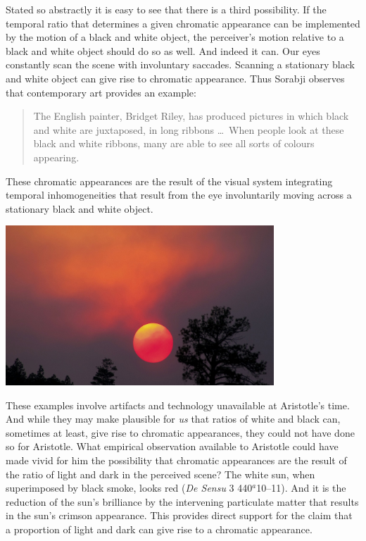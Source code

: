 Stated so abstractly it is easy to see that there is a third possibility. If the temporal ratio that determines a given chromatic appearance can be implemented by the motion of a black and white object, the perceiver's motion relative to a black and white object should do so as well. And indeed it can. Our eyes constantly scan the scene with involuntary saccades. Scanning a stationary black and white object can give rise to chromatic appearance. Thus Sorabji observes that contemporary art provides an example:
\begin{quote}
    The English painter, Bridget Riley, has produced pictures in which black and white are juxtaposed, in long ribbons \ldots\ When people look at these black and white ribbons, many are able to see all sorts of colours appearing.
\end{quote}
These chromatic appearances are the result of the visual system integrating temporal inhomogeneities that result from the eye involuntarily moving across a stationary black and white object. \change

\begin{frame}
	\begin{center}
		\includegraphics[height=6cm]{../../graphics/red_sun.jpg}
	\end{center}
\end{frame}

These examples involve artifacts and technology unavailable at Aristotle's time. And while they may make plausible for \emph{us} that ratios of white and black can, sometimes at least, give rise to chromatic appearances, they could not have done so for Aristotle. What empirical observation available to Aristotle could have made vivid for him the possibility that chromatic appearances are the result of the ratio of light and dark in the perceived scene? The white sun, when superimposed by black smoke, looks red (\emph{De Sensu} 3 440\( ^{a} \)10--11). And it is the reduction of the sun's brilliance by the intervening particulate matter that results in the sun's crimson appearance. This provides direct support for the claim that a proportion of light and dark can give rise to a chromatic appearance. \change

